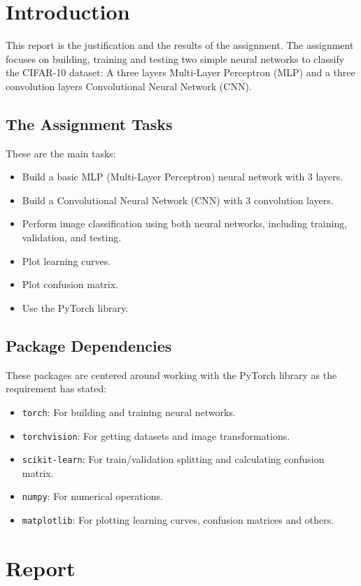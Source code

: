 \documentclass{report}
\begin{document}
\chapter*{Introduction}
This report is the justification and the results of the assignment. The assignment focuses on building, training and 
testing two simple neural networks to classify the CIFAR-10 dataset: A three layers Multi-Layer Perceptron 
(MLP) and a three convolution layers Convolutional Neural Network (CNN).

\section*{The Assignment Tasks}
These are the main tasks:
\begin{itemize}
    \item Build a basic MLP (Multi-Layer Perceptron) neural network with 3 layers.
    \item Build a Convolutional Neural Network (CNN) with 3 convolution layers.
    \item Perform image classification using both neural networks, including training, validation, and testing.
    \item Plot learning curves.
    \item Plot confusion matrix.
    \item Use the PyTorch library.
\end{itemize}

\section*{Package Dependencies}
These packages are centered around working with the PyTorch library as the requirement has stated:
\begin{itemize}
    \item \texttt{torch}: For building and training neural networks.
    \item \texttt{torchvision}: For getting datasets and image transformations.
    \item \texttt{scikit-learn}: For train/validation splitting and calculating confusion matrix.
    \item \texttt{numpy}: For numerical operations.
    \item \texttt{matplotlib}: For plotting learning curves, confusion matrices and others.
\end{itemize}

\tableofcontents

\chapter*{Report}
\end{document}
